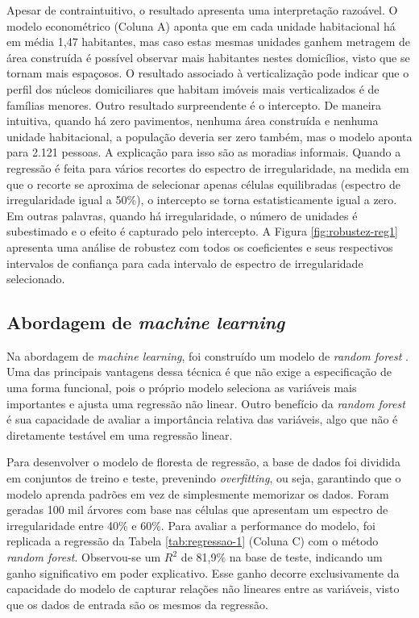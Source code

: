 Apesar de contraintuitivo, o resultado apresenta uma interpretação razoável. O modelo econométrico (Coluna A) aponta que em cada unidade habitacional há em média 1,47 habitantes, mas caso estas mesmas unidades ganhem metragem de área construída é possível observar mais habitantes nestes domicílios, visto que se tornam mais espaçosos. O resultado associado à verticalização pode indicar que o perfil dos núcleos domiciliares que habitam imóveis mais verticalizados é de famílias menores. Outro resultado surpreendente é o intercepto. De maneira intuitiva, quando há zero pavimentos, nenhuma área construída e nenhuma unidade habitacional, a população deveria ser zero também, mas o modelo aponta para 2.121 pessoas. A explicação para isso são as moradias informais. Quando a regressão é feita para vários recortes do espectro de irregularidade, na medida em que o recorte se aproxima de selecionar apenas células equilibradas (espectro de irregularidade igual a 50\%), o intercepto se torna estatisticamente igual a zero. Em outras palavras, quando há irregularidade, o número de unidades é subestimado e o efeito é capturado pelo intercepto. A Figura \ref{fig:robustez-reg1} apresenta uma análise de robustez com todos os coeficientes e seus respectivos intervalos de confiança para cada intervalo de espectro de irregularidade selecionado.

\subsection{Abordagem de \textit{machine learning}}

Na abordagem de \textit{machine learning}, foi construído um modelo de \textit{random forest} \cite{wright2015ranger}. Uma das principais vantagens dessa técnica é que não exige a especificação de uma forma funcional, pois o próprio modelo seleciona as variáveis mais importantes e ajusta uma regressão não linear. Outro benefício da \textit{random forest} é sua capacidade de avaliar a importância relativa das variáveis, algo que não é diretamente testável em uma regressão linear.


Para desenvolver o modelo de floresta de regressão, a base de dados foi dividida em conjuntos de treino e teste, prevenindo \textit{overfitting}, ou seja, garantindo que o modelo aprenda padrões em vez de simplesmente memorizar os dados. Foram geradas 100 mil árvores com base nas células que apresentam um espectro de irregularidade entre 40\% e 60\%. Para avaliar a performance do modelo, foi replicada a regressão da Tabela \ref{tab:regressao-1} (Coluna C) com o método \textit{random forest}. Observou-se um $R^2$ de 81,9\% na base de teste, indicando um ganho significativo em poder explicativo. Esse ganho decorre exclusivamente da capacidade do modelo de capturar relações não lineares entre as variáveis, visto que os dados de entrada são os mesmos da regressão.

